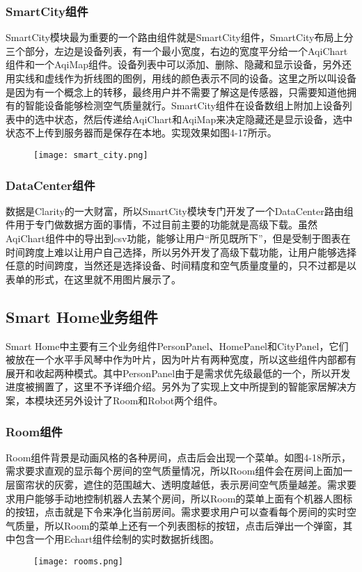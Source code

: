 \subsubsection{SmartCity组件}
SmartCity模块最为重要的一个路由组件就是SmartCity组件，SmartCity布局上分三个部分，左边是设备列表，有一个最小宽度，右边的宽度平分给一个AqiChart组件和一个AqiMap组件。设备列表中可以添加、删除、隐藏和显示设备，另外还用实线和虚线作为折线图的图例，用线的颜色表示不同的设备。这里之所以叫设备是因为有一个概念上的转移，最终用户并不需要了解这是传感器，只需要知道他拥有的智能设备能够检测空气质量就行。SmartCity组件在设备数组上附加上设备列表中的选中状态，然后传递给AqiChart和AqiMap来决定隐藏还是显示设备，选中状态不上传到服务器而是保存在本地。实现效果如图4-17所示。
\begin{figure}[!htp]
 \centering
 \texttt{[image: smart\_city.png]}
\end{figure}
\subsubsection{DataCenter组件}
数据是Clarity的一大财富，所以SmartCity模块专门开发了一个DataCenter路由组件用于专门做数据方面的事情，不过目前主要的功能就是高级下载。虽然AqiChart组件中的导出到csv功能，能够让用户“所见既所下”，但是受制于图表在时间跨度上难以让用户自己选择，所以另外开发了高级下载功能，让用户能够选择任意的时间跨度，当然还是选择设备、时间精度和空气质量度量的，只不过都是以表单的形式，在这里就不用图片展示了。
\subsection{Smart Home业务组件}
Smart Home中主要有三个业务组件PersonPanel、HomePanel和CityPanel，它们被放在一个水平手风琴中作为叶片，因为叶片有两种宽度，所以这些组件内部都有展开和收起两种模式。其中PersonPanel由于是需求优先级最低的一个，所以开发进度被搁置了，这里不予详细介绍。另外为了实现上文中所提到的智能家居解决方案，本模块还另外设计了Room和Robot两个组件。
\subsubsection{Room组件}
Room组件背景是动画风格的各种房间，点击后会出现一个菜单。如图4-18所示，需求要求直观的显示每个房间的空气质量情况，所以Room组件会在房间上面加一层窗帘状的灰雾，遮住的范围越大、透明度越低，表示房间空气质量越差。需求要求用户能够手动地控制机器人去某个房间，所以Room的菜单上面有个机器人图标的按钮，点击就是下令来净化当前房间。需求要求用户可以查看每个房间的实时空气质量，所以Room的菜单上还有一个列表图标的按钮，点击后弹出一个弹窗，其中包含一个用Echart组件绘制的实时数据折线图。
\begin{figure}[!htp]
 \centering
 \texttt{[image: rooms.png]}
\end{figure}
